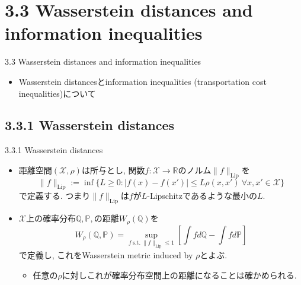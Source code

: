 \documentclass[aspectratio=169, dvipdfmx]{beamer}
\begin{document}
\section{3.3 Wasserstein distances and information inequalities}
\begin{frame}{3.3 Wasserstein distances and information inequalities}
\begin{itemize}
    \item Wasserstein distancesとinformation inequalities (transportation cost inequalities)について
\end{itemize}
\end{frame}

\subsection{3.3.1 Wasserstein distances}
\begin{frame}{3.3.1 Wasserstein distances}
    \begin{itemize}
        \item 距離空間$(\mathcal{X}, \rho)$は所与とし,
        関数$f:\mathcal{X} \to \mathbb{R}$のノルム$\|f\|_{\mathrm{Lip}}$を
        \[
            \|f\|_{\mathrm{Lip}} := \inf \{ L \ge 0 : |f(x)-f(x')| \le L \rho(x, x') \ \forall x, x'\in\mathcal{X} \}
        \]
        で定義する. つまり$\|f\|_{\mathrm{Lip}}$は$f$が$L$-Lipschitzであるような最小の$L$.
        \item $\mathcal{X}$上の確率分布$\mathbb{Q}, \mathbb{P},$の距離$W_\rho(\mathbb{Q})$を
        \[
            W_\rho(\mathbb{Q}, \mathbb{P})
            = \sup_{f\mathrm{\ s.t.}\ \|f\|_\mathrm{Lip}\le 1}
            \left[\int fd\mathbb{Q}-\int fd\mathbb{P}\right]
            \tag{3.52}\label{3.52}
        \]
        で定義し, これをWasserstein metric induced by $\rho$とよぶ.
        \begin{itemize}
            \item 任意の$\rho$に対しこれが確率分布空間上の距離になることは確かめられる.
        \end{itemize}
    \end{itemize}
\end{frame}
\end{document}
